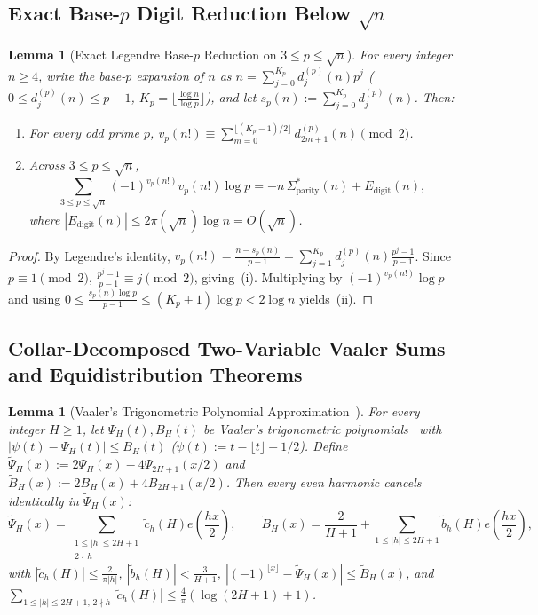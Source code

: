 \documentclass[11pt,reqno]{amsart}
\newtheorem{lemma}[theorem]{Lemma}
\theoremstyle{remark}
\begin{document}
\subsection{Exact Base-$p$ Digit Reduction Below $\sqrt{n}$}
\begin{lemma}[Exact Legendre Base-$p$ Reduction on $3 \le p \le \sqrt{n}$]\label{lem:2.2}
For every integer $n \ge 4$, write the base-$p$ expansion of $n$ as $n = \sum_{j=0}^{K_p} d_j^{(p)}(n) p^j$ ($0 \le d_j^{(p)}(n) \le p - 1$, $K_p = \lfloor \frac{\log n}{\log p} \rfloor$), and let $s_p(n) := \sum_{j=0}^{K_p} d_j^{(p)}(n)$. Then:
\begin{enumerate}
\item[(i)] For every odd prime $p$, $v_p(n!) \equiv \sum_{m=0}^{\lfloor (K_p - 1)/2 \rfloor} d_{2m+1}^{(p)}(n) \pmod 2$.
\item[(ii)] Across $3 \le p \le \sqrt{n}$,
\begin{equation}\label{eq:digit-red}
\sum_{3 \le p \le \sqrt{n}} (-1)^{v_p(n!)} v_p(n!) \log p = -n\,\Sigma^*_{\mathrm{parity}}(n) + E_{\mathrm{digit}}(n),
\end{equation}
where $|E_{\mathrm{digit}}(n)| \le 2 \pi(\sqrt{n}) \log n = O(\sqrt{n})$.
\end{enumerate}
\end{lemma}
\begin{proof}
By Legendre's identity, $v_p(n!) = \frac{n - s_p(n)}{p - 1} = \sum_{j=1}^{K_p} d_j^{(p)}(n) \frac{p^j - 1}{p - 1}$. Since $p \equiv 1 \pmod 2$, $\frac{p^j - 1}{p - 1} \equiv j \pmod 2$, giving~(i). Multiplying by $(-1)^{v_p(n!)}\log p$ and using $0 \le \frac{s_p(n)\log p}{p-1} \le (K_p + 1)\log p < 2\log n$ yields~(ii).
\end{proof}

\subsection{Collar-Decomposed Two-Variable Vaaler Sums and Equidistribution Theorems}
\begin{lemma}[Vaaler's Trigonometric Polynomial Approximation~\cite{Vaaler1985}]\label{lem:2.3}
For every integer $H \ge 1$, let $\Psi_H(t), B_H(t)$ be Vaaler's trigonometric polynomials~\cite[Theorem~18]{Vaaler1985} with $|\psi(t) - \Psi_H(t)| \le B_H(t)$ ($\psi(t) := t - \lfloor t \rfloor - 1/2$). Define $\widetilde{\Psi}_H(x) := 2\Psi_H(x) - 4\Psi_{2H+1}(x/2)$ and $\widetilde{B}_H(x) := 2B_H(x) + 4B_{2H+1}(x/2)$. Then every even harmonic cancels identically in $\widetilde{\Psi}_H(x)$:
\[
\widetilde{\Psi}_H(x) = \sum_{\substack{1 \le |h| \le 2H+1 \\ 2 \nmid h}} \tilde{c}_h(H) e\!\left(\frac{hx}{2}\right), \qquad
\widetilde{B}_H(x) = \frac{2}{H+1} + \sum_{1 \le |h| \le 2H+1} \tilde{b}_h(H) e\!\left(\frac{hx}{2}\right),
\]
with $|\tilde{c}_h(H)| \le \frac{2}{\pi |h|}$, $|\tilde{b}_h(H)| < \frac{3}{H+1}$, $|(-1)^{\lfloor x \rfloor} - \widetilde{\Psi}_H(x)| \le \widetilde{B}_H(x)$, and $\sum_{1 \le |h| \le 2H+1,\, 2 \nmid h} |\tilde{c}_h(H)| \le \frac{4}{\pi}(\log(2H+1) + 1)$.
\end{lemma}
\end{document}
